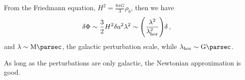 \documentclass[main.tex]{subfiles}
\begin{document}
From the Friedmann equation, \(H^2=  \frac{8 \pi G}{3} \rho_b\), then we have 
%
\begin{align}
  \delta \Phi \sim \frac{3}{2} H^2 \delta a^2 \lambda^2 \sim  \qty(\frac{\lambda^2  }{\lambda _{\text{hor}}^2}) \delta 
\,,
\end{align}
%
and \(\lambda \sim \SI{}{\mega\parsec}\), the galactic perturbation scale, while \(\lambda _{\text{hor}} \sim \SI{}{\giga\parsec}\). 

As long as the perturbations are only galactic, the Newtonian approximation is good. 
\end{document}
